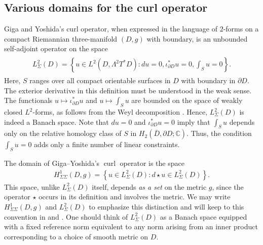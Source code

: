 \documentclass[11pt,reqno]{amsart}
\DeclareMathOperator{\curl}{curl}
\newcommand{\hodge}{\!\star\!}
\begin{document}
\subsection{Various domains for the curl operator}\label{subsection: domains of curl}

Giga and Yoshida's curl operator, when expressed in the language of $2$-forms on a compact Riemannian three-manifold $(D,g)$ with boundary, is an unbounded self-adjoint operator on the space
\begin{align*}
    \begin{split}
    L^2_\Sigma(D) = \left\{u \in L^2(D,\Lambda^2 T^\ast D): du = 0, \iota_{\partial D}^\ast u = 0, \textstyle \int_S u = 0\right\}.
    \end{split}
\end{align*}
Here, $S$ ranges over all compact orientable surfaces in $D$ with boundary in $\partial D$. The exterior derivative in this definition must be understood in the weak sense. The functionals $u \mapsto \iota_{\partial D}^\ast u$ and $u \mapsto \textstyle \int_S u$ are bounded on the space of weakly closed $L^2$-forms, as follows from the Weyl decomposition \cite[Chapter 2]{Schwarz1995}. Hence, $L^2_\Sigma(D)$ is indeed a Banach space.
Note that $du = 0$ and $\iota_{\partial D}^\ast u = 0$ imply that $\int_S u$ depends only on the relative homology class of $S$ in $H_2 (\bar D,\partial D;\mathbb C)$. Thus, the condition $\int_S u = 0$ adds only a finite number of linear constraints.

The domain of Giga--Yoshida's $\curl$ operator is the space
\begin{align*}
    H^1_{\Sigma\Sigma}(D,g) = \left\{u \in L^2_\Sigma(D): d \hodge u \in L^2_\Sigma(D) \right\}.
\end{align*}
This space, unlike $L^2_\Sigma(D)$ itself, depends \emph{as a set} on the metric $g$, since the operator $\star$ occurs in its definition and involves the metric. We may write $H_{\Sigma\Sigma}^1(D,g)$ and $L^2_\Sigma(D)$ to emphasize this distinction and will keep to this convention in  and . One should think of $L^2_\Sigma(D)$ as a Banach space equipped with a fixed reference norm equivalent to any norm arising from an inner product corresponding to a choice of smooth metric on $D$.
\end{document}
